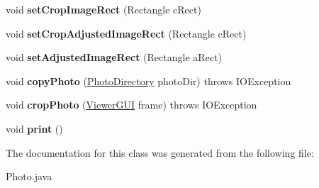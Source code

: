 \begin{DoxyCompactItemize}
\item 
\hypertarget{class_photo_aa7a53aad4146948df48ac73e25ee9ebd}{void {\bfseries set\-Crop\-Image\-Rect} (Rectangle c\-Rect)}\label{class_photo_aa7a53aad4146948df48ac73e25ee9ebd}

\item 
\hypertarget{class_photo_aacf719d5137e8693755d382b518401e3}{void {\bfseries set\-Crop\-Adjusted\-Image\-Rect} (Rectangle c\-Rect)}\label{class_photo_aacf719d5137e8693755d382b518401e3}

\item 
\hypertarget{class_photo_a43da5ba27fb5ab7c236f5c6befa8ee32}{void {\bfseries set\-Adjusted\-Image\-Rect} (Rectangle a\-Rect)}\label{class_photo_a43da5ba27fb5ab7c236f5c6befa8ee32}

\item 
\hypertarget{class_photo_a04d29772c91304ba57e083c0b7c3e5e1}{void {\bfseries copy\-Photo} (\hyperlink{class_photo_directory}{Photo\-Directory} photo\-Dir)  throws I\-O\-Exception }\label{class_photo_a04d29772c91304ba57e083c0b7c3e5e1}

\item 
\hypertarget{class_photo_ae9333b659600b85c69bfb0f1621c580e}{void {\bfseries crop\-Photo} (\hyperlink{class_viewer_g_u_i}{Viewer\-G\-U\-I} frame)  throws I\-O\-Exception }\label{class_photo_ae9333b659600b85c69bfb0f1621c580e}

\item 
\hypertarget{class_photo_ac635da00197d7b7d50517b8f0218c2be}{void {\bfseries print} ()}\label{class_photo_ac635da00197d7b7d50517b8f0218c2be}

\end{DoxyCompactItemize}


The documentation for this class was generated from the following file\-:\begin{DoxyCompactItemize}
\item 
Photo.\-java\end{DoxyCompactItemize}
